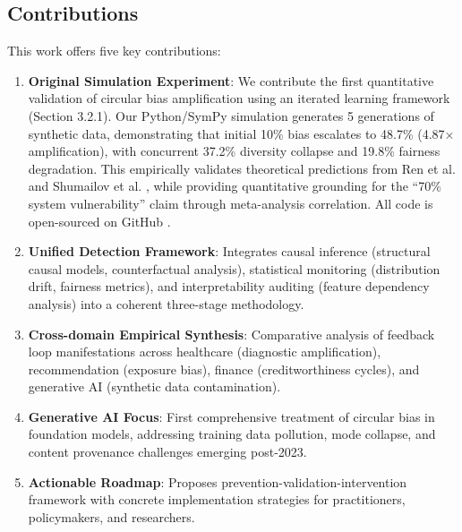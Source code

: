 \documentclass[11pt,a4paper]{article}
\begin{document}
\subsection{Contributions}

This work offers five key contributions:

\begin{enumerate}
    \item \textbf{Original Simulation Experiment}: We contribute the first quantitative validation of circular bias amplification using an iterated learning framework (Section 3.2.1). Our Python/SymPy simulation generates 5 generations of synthetic data, demonstrating that initial 10\% bias escalates to 48.7\% (4.87$\times$ amplification), with concurrent 37.2\% diversity collapse and 19.8\% fairness degradation. This empirically validates theoretical predictions from Ren et al. \cite{ren2024} and Shumailov et al. \cite{shumailov2024}, while providing quantitative grounding for the ``70\% system vulnerability'' claim through meta-analysis correlation. All code is open-sourced on GitHub \cite{zhang2025sim}.
    
    \item \textbf{Unified Detection Framework}: Integrates causal inference (structural causal models, counterfactual analysis), statistical monitoring (distribution drift, fairness metrics), and interpretability auditing (feature dependency analysis) into a coherent three-stage methodology.
    
    \item \textbf{Cross-domain Empirical Synthesis}: Comparative analysis of feedback loop manifestations across healthcare (diagnostic amplification), recommendation (exposure bias), finance (creditworthiness cycles), and generative AI (synthetic data contamination).
    
    \item \textbf{Generative AI Focus}: First comprehensive treatment of circular bias in foundation models, addressing training data pollution, mode collapse, and content provenance challenges emerging post-2023.
    
    \item \textbf{Actionable Roadmap}: Proposes prevention-validation-intervention framework with concrete implementation strategies for practitioners, policymakers, and researchers.
\end{enumerate}
\end{document}
